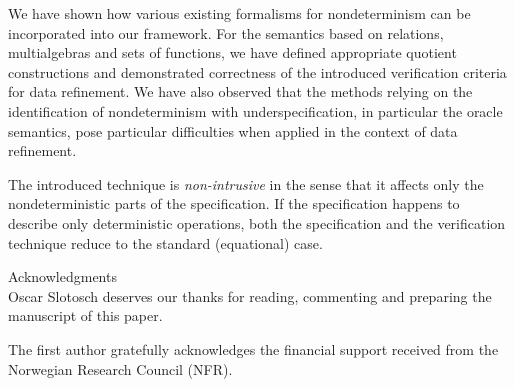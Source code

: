 We have shown how various existing formalisms for nondeterminism can be incorporated into our framework. For the semantics based on relations, multialgebras and sets of functions, we have defined appropriate quotient constructions and demonstrated correctness of the introduced verification criteria for data refinement. We have also observed that the methods
relying on the identification of nondeterminism with underspecification, in particular the oracle semantics, pose particular difficulties when applied in the context of data refinement.

The introduced technique is {\em non-intrusive} in the sense that it affects only the nondeterministic parts of the specification. If the specification happens to describe only deterministic operations, both the specification and the verification technique reduce to the standard (equational) case.\\[1ex] \begin{REMARK}{Acknowledgments}\\[1ex]
Oscar Slotosch deserves our thanks for reading, commenting and preparing 
the manuscript of this paper.

The first author gratefully acknowledges the financial support received from the Norwegian Research Council (NFR).
\end{REMARK}

